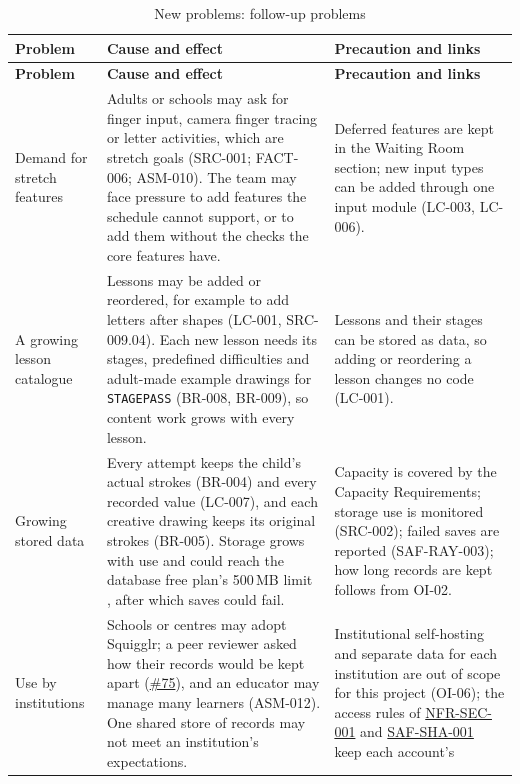 \documentclass[12pt]{article}
\renewcommand{\_}{\textunderscore\allowbreak}%
\newcommand{\reqref}[1]{\hyperref[req:#1]{#1}}
\begin{document}
{\small
\begin{longtable}{@{}>{\raggedright\arraybackslash}p{}%
>{\raggedright\arraybackslash}p{}%
>{\raggedright\arraybackslash}p{}@{}}
\caption{New problems: follow-up problems}
\label{tab:new-problems-follow-up}\\
\toprule
\textbf{Problem} & \textbf{Cause and effect} & \textbf{Precaution and links} \\
\midrule
\endfirsthead
\toprule
\textbf{Problem} & \textbf{Cause and effect} & \textbf{Precaution and links} \\
\midrule
\endhead
\bottomrule
\endlastfoot
Demand for stretch features & Adults or schools may ask for finger input, camera
finger tracing or letter activities, which are stretch goals (SRC-001; FACT-006;
ASM-010). The team may face pressure to add features the schedule cannot
support, or to add them without the checks the core features have. & Deferred
features are kept in the Waiting Room section; new input types can be added
through one input module (LC-003, LC-006). \\
\addlinespace
A growing lesson catalogue & Lessons may be added or reordered, for example to
add letters after shapes (LC-001, SRC-009.04). Each new lesson needs its stages,
predefined difficulties and adult-made example drawings for \texttt{STAGE\_PASS}
(BR-008, BR-009), so content work grows with every lesson. & Lessons and their
stages can be stored as data, so adding or reordering a lesson changes no code
(LC-001). \\
\addlinespace
Growing stored data & Every attempt keeps the child's actual strokes (BR-004)
and every recorded value (LC-007), and each creative drawing keeps its original
strokes (BR-005). Storage grows with use and could reach the database free
plan's 500\,MB limit \citep{Supabase2026Pricing}, after which saves could fail.
& Capacity is covered by the Capacity Requirements; storage use is monitored
(SRC-002); failed saves are reported (SAF-RAY-003); how long records are kept
follows from OI-02. \\
\addlinespace
Use by institutions & Schools or centres may adopt Squigglr; a peer reviewer
asked how their records would be kept apart
(\href{https://github.com/AHMEDELZARIA/squigglr/issues/75}{\#75}), and an
educator may manage many learners (ASM-012). One shared store of records may not
meet an institution's expectations. & Institutional self-hosting and separate
data for each institution are out of scope for this project (OI-06); the access
rules of \reqref{NFR-SEC-001} and \reqref{SAF-SHA-001} keep each account's

\end{longtable}}
\end{document}
